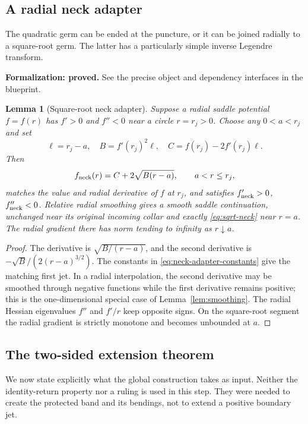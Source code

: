 \documentclass[11pt]{amsart}
\newtheorem{lemma}[theorem]{Lemma}
\theoremstyle{definition}
\theoremstyle{remark}
\numberwithin{equation}{section}
\begin{document}
\subsection{A radial neck adapter}
The quadratic germ can be ended at the puncture, or it can be joined
radially to a square-root germ. The latter has a particularly simple
inverse Legendre transform.

\par\noindent\textbf{Formalization: proved.} See the precise object and dependency interfaces in the blueprint.\par
\begin{lemma}[Square-root neck adapter]\label{lem:neck-adapter}
Suppose a radial saddle potential $f=f(r)$ has $f'>0$ and $f''<0$
near a circle $r=r_j>0$. Choose any $0<a<r_j$ and set
\begin{equation}\label{eq:neck-adapter-constants}
 \ell=r_j-a,\quad B=f'(r_j)^2\ell,\quad
 C=f(r_j)-2f'(r_j)\ell.
\end{equation}
Then
\begin{equation}\label{eq:sqrt-neck}
 f_{\rm neck}(r)=C+2\sqrt{B(r-a)},\qquad a<r\le r_j,
\end{equation}
matches the value and radial derivative of $f$ at $r_j$, and satisfies
$f_{\rm neck}'>0$, $f_{\rm neck}''<0$. Relative radial smoothing gives
a smooth saddle continuation, unchanged near its original incoming
collar and exactly \eqref{eq:sqrt-neck} near $r=a$. The radial gradient
there has norm tending to infinity as $r\downarrow a$.
\end{lemma}
\begin{proof}
The derivative is $\sqrt{B/(r-a)}$, and the second derivative is
$-\sqrt B/(2(r-a)^{3/2})$. The constants in
\eqref{eq:neck-adapter-constants} give the matching first jet. In a
radial interpolation, the second derivative may be smoothed through
negative functions while the first derivative remains positive; this
is the one-dimensional special case of Lemma~\ref{lem:smoothing}.
The radial Hessian eigenvalues $f''$ and $f'/r$ keep opposite signs.
On the square-root segment the radial gradient is strictly monotone
and becomes unbounded at $a$.
\end{proof}

\subsection{The two-sided extension theorem}
We now state explicitly what the global construction takes as input.
Neither the identity-return property nor a ruling is used in this
step. They were needed to create the protected band and its bendings,
not to extend a positive boundary jet.
\end{document}
